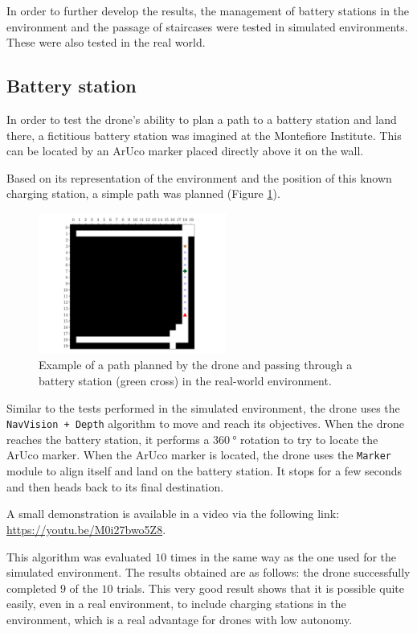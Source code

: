 In order to further develop the results, the management of battery stations in the environment and the passage of staircases were tested in simulated environments. These were also tested in the real world.

\subsection{Battery station}

In order to test the drone's ability to plan a path to a battery station and land there, a fictitious battery station was imagined at the Montefiore Institute. This can be located by an ArUco marker placed directly above it on the wall.

Based on its representation of the environment and the position of this known charging station, a simple path was planned (Figure \ref{fig:07.advanced.battery.path}).

\begin{figure}[H]
    \centering
    \includegraphics[width=0.55\textwidth]{resources/pdf/07/battery/path.pdf}
    \caption{Example of a path planned by the drone and passing through a battery station (green cross) in the real-world environment.}
    \label{fig:07.advanced.battery.path}
\end{figure}

Similar to the tests performed in the simulated environment, the drone uses the \texttt{NavVision + Depth} algorithm to move and reach its objectives. When the drone reaches the battery station, it performs a $\SI{360}{\degree}$ rotation to try to locate the ArUco marker. When the ArUco marker is located, the drone uses the \texttt{Marker} module to align itself and land on the battery station. It stops for a few seconds and then heads back to its final destination.

A small demonstration is available in a video via the following link: \url{https://youtu.be/M0i27bwo5Z8}.

This algorithm was evaluated $\num{10}$ times in the same way as the one used for the simulated environment. The results obtained are as follows: the drone successfully completed $\num{9}$ of the $\num{10}$ trials. This very good result shows that it is possible quite easily, even in a real environment, to include charging stations in the environment, which is a real advantage for drones with low autonomy.

